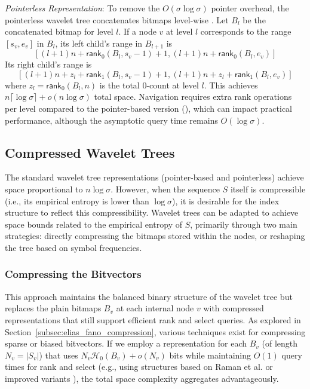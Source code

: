 \emph{Pointerless Representation}: To remove the $O(\sigma \log \sigma)$ pointer overhead, the pointerless wavelet tree concatenates bitmaps level-wise \cite{MAKINEN2007332, MAKINEN2006703}. Let $B_l$ be the concatenated bitmap for level $l$. If a node $v$ at level $l$ corresponds to the range $[s_v, e_v]$ in $B_l$, its left child's range in $B_{l+1}$ is
\[
    [(l+1)n + \textsf{rank}_0(B_l, s_v-1) + 1, (l+1)n + \textsf{rank}_0(B_l, e_v)]
\]
Its right child's range is
\[
    [(l+1)n + z_l + \textsf{rank}_1(B_l, s_v-1) + 1, (l+1)n + z_l + \textsf{rank}_1(B_l, e_v)]
\]
where $z_l = \textsf{rank}_0(B_l, n)$ is the total $0$-count at level $l$. This achieves $n \lceil \log \sigma \rceil + o(n \log \sigma)$ total space. Navigation requires extra \textsf{rank} operations per level compared to the pointer-based version (\cite{claude2015wavelet}), which can impact practical performance, although the asymptotic query time remains $O(\log \sigma)$.

\subsection{Compressed Wavelet Trees} \label{sec:compressed_WT}

The standard wavelet tree representations (pointer-based and pointerless) achieve space proportional to $n \log \sigma$. However, when the sequence $S$ itself is compressible (i.e., its empirical entropy is lower than $\log \sigma$), it is desirable for the index structure to reflect this compressibility. Wavelet trees can be adapted to achieve space bounds related to the empirical entropy of $S$, primarily through two main strategies: directly compressing the bitmaps stored within the nodes, or reshaping the tree based on symbol frequencies.

\subsubsection{Compressing the Bitvectors} \label{subsec:compressing_bitvectors}

This approach maintains the balanced binary structure of the wavelet tree but replaces the plain bitmaps $B_v$ at each internal node $v$ with compressed representations that still support efficient \textsf{rank} and \textsf{select} queries. As explored in Section~\ref{subsec:elias_fano_compression}, various techniques exist for compressing sparse or biased bitvectors. If we employ a representation for each $B_v$ (of length $N_v = |S_v|$) that uses $N_v \mathcal{H}_0(B_v) + o(N_v)$ bits while maintaining $O(1)$ query times for \textsf{rank} and \textsf{select} (e.g., using structures based on Raman et al. \cite{RRR2002} or improved variants \cite{patrascu2008succincter}), the total space complexity aggregates advantageously.

